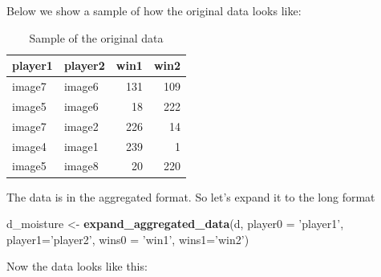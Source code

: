 \documentclass[
]{book}
\newenvironment{Shaded}{\begin{snugshade}}{\end{snugshade}}
\newcommand{\DataTypeTok}[1]{\textcolor[rgb]{0.13,0.29,0.53}{#1}}
\newcommand{\DecValTok}[1]{\textcolor[rgb]{0.00,0.00,0.81}{#1}}
\newcommand{\KeywordTok}[1]{\textcolor[rgb]{0.13,0.29,0.53}{\textbf{#1}}}
\newcommand{\NormalTok}[1]{#1}
\newcommand{\OperatorTok}[1]{\textcolor[rgb]{0.81,0.36,0.00}{\textbf{#1}}}
\newcommand{\StringTok}[1]{\textcolor[rgb]{0.31,0.60,0.02}{#1}}
\begin{document}
Below we show a sample of how the original data looks like:

\begin{Shaded}
\end{Shaded}

\begin{table}

\caption{\label{tab:unnamed-chunk-19}Sample of the original data}
\centering
\begin{tabular}[t]{l|l|r|r}
\hline
player1 & player2 & win1 & win2\\
\hline
image7 & image6 & 131 & 109\\
\hline
image5 & image6 & 18 & 222\\
\hline
image7 & image2 & 226 & 14\\
\hline
image4 & image1 & 239 & 1\\
\hline
image5 & image8 & 20 & 220\\
\hline
\end{tabular}
\end{table}

The data is in the aggregated format. So let's expand it to the long format

\begin{Shaded}
\begin{Highlighting}[]
\NormalTok{d_moisture <-}\StringTok{ }\KeywordTok{expand_aggregated_data}\NormalTok{(d, }\DataTypeTok{player0 =} \StringTok{'player1'}\NormalTok{, }\DataTypeTok{player1=}\StringTok{'player2'}\NormalTok{, }\DataTypeTok{wins0 =} \StringTok{'win1'}\NormalTok{, }\DataTypeTok{wins1=}\StringTok{'win2'}\NormalTok{)}
\end{Highlighting}
\end{Shaded}

Now the data looks like this:

\begin{Shaded}
\end{Shaded}
\end{document}
